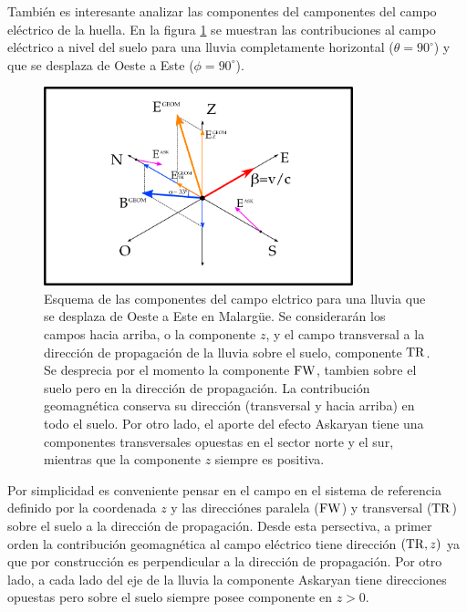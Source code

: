 	También es interesante analizar las componentes del camponentes del campo eléctrico de la huella.
	En la figura \ref{fig:malField} se muestran las contribuciones al campo eléctrico a nivel del suelo para una lluvia completamente horizontal ($\theta=90^\circ$) y que se desplaza de Oeste a Este ($\phi=90^\circ$).
	\begin{figure}[ht!]
		\centering
		\includegraphics[width=0.8\textwidth]{./fig/simulacionRadio/malField}
		\caption{\label{fig:malField}
		Esquema de las componentes del campo elctrico para una lluvia que se desplaza de Oeste a Este en Malargüe. Se considerarán los campos hacia arriba, o la componente $z$, y el campo transversal a la dirección de propagación de la lluvia sobre el suelo, componente ${\rm TR}$. Se desprecia por el momento la componente ${\rm FW}$, tambien sobre el suelo pero en la dirección de propagación. La contribución geomagnética conserva su dirección (transversal y hacia arriba) en todo el suelo. Por otro lado, el aporte del efecto Askaryan tiene una componentes transversales opuestas en el sector norte y el sur, mientras que la componente $z$ siempre es positiva.
		}
	\end{figure}
	Por simplicidad es conveniente pensar en el campo en el sistema de referencia definido por la coordenada $z$ y las direcciónes paralela (${\rm FW}$) y transversal (${\rm TR}$) sobre el suelo a la dirección de propagación.
	Desde esta persectiva, a primer orden la contribución geomagnética al campo eléctrico tiene dirección $({\rm TR},z)$ ya que por construcción es perpendicular a la dirección de propagación.
	Por otro lado, a cada lado del eje de la lluvia la componente Askaryan tiene direcciones opuestas pero sobre el suelo siempre posee componente en $z>0$.
	
